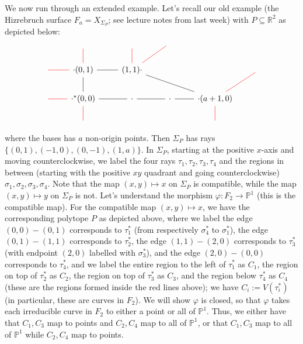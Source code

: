 \documentclass[a4paper,12pt]{amsart}
\newcommand{\R}{\ensuremath{\mathbb{R}}}
\begin{document}
\begin{example}
We now run through an extended example. Let's recall our old example (the Hizrebruch surface $F_a = X_{\Sigma_P}$; see lecture notes from last week) with $P \subseteq \R^2$ as depicted below:
\[\begin{tikzcd}
	\text{}& \text{} \arrow[d,red,dash]&\text{} & \text{} &      \\
	\arrow[r,red,dash] &\cdot(0,1) \arrow[r,dash] \arrow[d,dash] &(1,1) \cdot \arrow[rrd, dash] \arrow[ur,red,dash]  \arrow[u,red,dash] & & &\text{}   \\
	\arrow[r,red,dash]&\cdot^*(0,0) \arrow[r,dash] \arrow[d,red,dash] &	\cdot &\cdot \arrow[l,dash]   &\cdot (a+1,0) \arrow[l,dash] \arrow[d,red,dash]\arrow[ru,red,dash] &   \\
&\text{} & & &	\text{}
	\end{tikzcd}\]
	where the bases has $a$ non-origin points. Then $\Sigma_P$ has rays $\{ (0,1), (-1,0), (0,-1), (1,a)\}.$ In $\Sigma_P$, starting at the positive $x$-axis and moving counterclockwise, we label the four rays $\tau_1, \tau_2, \tau_3, \tau_4$ and the regions in between (starting with the positive $xy$ quadrant and going counterclockwise) $\sigma_1, \sigma_2, \sigma_3, \sigma_4$. Note that the map $(x,y) \mapsto x$ on $\Sigma_P$ is compatible, while the map $(x,y) \mapsto y$ on $\Sigma_P$ is not. Let's understand the morphism $\varphi: F_2 \to \mathbb{P}^1$ (this is the compatible map). For the compatible map $(x,y) \mapsto x$, we have the corresponding polytope $P$ as depicted above, where we label the edge $(0,0) - (0,1)$ corresponds to $\tau_1^*$ (from respectively $\sigma_4^*$ to $\sigma_1^*$), the edge $(0,1) - (1,1)$ corresponds to $\tau_2^*$, the edge $(1,1) - (2,0)$ corresponds to $\tau_3^*$ (with endpoint $(2,0)$ labelled with $\sigma_3^*$), and the edge $(2,0) - (0,0)$ corresponds to $\tau_4^*$, and we label the entire region to the left of $\tau_1^*$ as $C_1$, the region on top of $\tau_2^*$ as $C_2$, the region on top of $\tau_3^*$ as $C_3$, and the region below $\tau_4^*$ as $C_4$ (these are the regions formed inside the red lines above); we have $C_i := V(\tau_i^*)$ (in particular, these are curves in $F_2$). We will show $\varphi$ is closed, so that $\varphi$ takes each irreducible curve in $F_2$ to either a point or all of $\mathbb{P}^1$. Thus, we either have that $C_1,C_3$ map to points and $C_2,C_4$ map to all of $\mathbb{P}^1$, or that $C_1,C_3$ map to all of $\mathbb{P}^1$ while $C_2, C_4$ map to points. 
	\\\\

\end{example}
\end{document}

